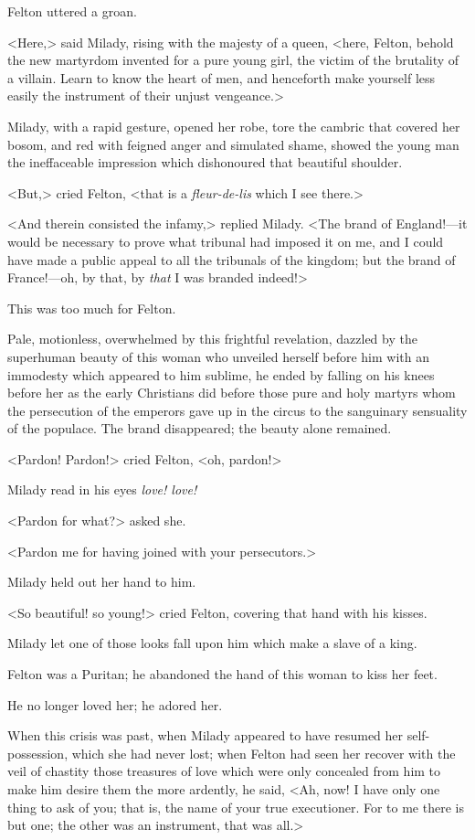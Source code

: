 Felton uttered a groan. 

<Here,> said Milady, rising with the majesty of a queen, <here, Felton, behold the new martyrdom invented for a pure young girl, the victim of the brutality of a villain. Learn to know the heart of men, and henceforth make yourself less easily the instrument of their unjust vengeance.> 

Milady, with a rapid gesture, opened her robe, tore the cambric that covered her bosom, and red with feigned anger and simulated shame, showed the young man the ineffaceable impression which dishonoured that beautiful shoulder. 

<But,> cried Felton, <that is a \textit{fleur-de-lis} which I see there.> 

<And therein consisted the infamy,> replied Milady. <The brand of England!---it would be necessary to prove what tribunal had imposed it on me, and I could have made a public appeal to all the tribunals of the kingdom; but the brand of France!---oh, by that, by \textit{that} I was branded indeed!> 

This was too much for Felton. 

Pale, motionless, overwhelmed by this frightful revelation, dazzled by the superhuman beauty of this woman who unveiled herself before him with an immodesty which appeared to him sublime, he ended by falling on his knees before her as the early Christians did before those pure and holy martyrs whom the persecution of the emperors gave up in the circus to the sanguinary sensuality of the populace. The brand disappeared; the beauty alone remained. 

<Pardon! Pardon!> cried Felton, <oh, pardon!> 

Milady read in his eyes \textit{love! love!} 

<Pardon for what?> asked she. 

<Pardon me for having joined with your persecutors.> 

Milady held out her hand to him. 

<So beautiful! so young!> cried Felton, covering that hand with his kisses. 

Milady let one of those looks fall upon him which make a slave of a king. 

Felton was a Puritan; he abandoned the hand of this woman to kiss her feet. 

He no longer loved her; he adored her. 

When this crisis was past, when Milady appeared to have resumed her self-possession, which she had never lost; when Felton had seen her recover with the veil of chastity those treasures of love which were only concealed from him to make him desire them the more ardently, he said, <Ah, now! I have only one thing to ask of you; that is, the name of your true executioner. For to me there is but one; the other was an instrument, that was all.> 

